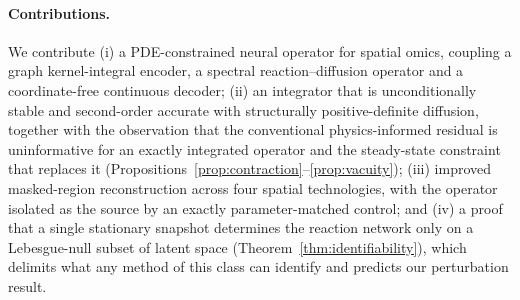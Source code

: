 \paragraph{Contributions.}
We contribute (i) a PDE-constrained neural operator for spatial omics, coupling a
graph kernel-integral encoder, a spectral reaction--diffusion operator and a
coordinate-free continuous decoder; (ii) an integrator that is unconditionally
stable and second-order accurate with structurally positive-definite diffusion,
together with the observation that the conventional physics-informed residual is
uninformative for an exactly integrated operator and the steady-state constraint
that replaces it (Propositions~\ref{prop:contraction}--\ref{prop:vacuity});
(iii) improved masked-region reconstruction across four spatial technologies,
with the operator isolated as the source by an exactly parameter-matched control;
and (iv) a proof that a single stationary snapshot determines the reaction
network only on a Lebesgue-null subset of latent space
(Theorem~\ref{thm:identifiability}), which delimits what any method of this class
can identify and predicts our perturbation result.
